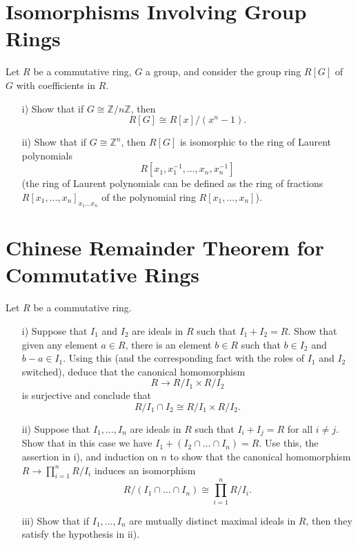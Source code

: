 \documentclass[lang=cn,11pt]{template}
\begin{document}
\section{Isomorphisms Involving Group Rings}
Let \( R \) be a commutative ring, \( G \) a group, and consider the group ring \( R[G] \) of \( G \) with coefficients in \( R \).
\begin{itemize}
    \item[i)] Show that if \( G \cong \mathbb{Z}/n\mathbb{Z} \), then
    \[
    R[G] \cong R[x]/(x^n - 1).
    \]
    \item[ii)] Show that if \( G \cong \mathbb{Z}^n \), then \( R[G] \) is isomorphic to the ring of Laurent polynomials
    \[
    R[x_1, x_1^{-1}, \dots, x_n, x_n^{-1}]
    \]
    (the ring of Laurent polynomials can be defined as the ring of fractions \( R[x_1, \dots, x_n]_{x_1 \dots x_n} \) of the polynomial ring \( R[x_1, \dots, x_n] \)).
\end{itemize}

\section{Chinese Remainder Theorem for Commutative Rings}
Let \( R \) be a commutative ring.
\begin{itemize}
    \item[i)] Suppose that \( I_1 \) and \( I_2 \) are ideals in \( R \) such that \( I_1 + I_2 = R \). Show that given any element \( a \in R \), there is an element \( b \in R \) such that \( b \in I_2 \) and \( b - a \in I_1 \). Using this (and the corresponding fact with the roles of \( I_1 \) and \( I_2 \) switched), deduce that the canonical homomorphism
    \[
    R \rightarrow R/I_1 \times R/I_2
    \]
    is surjective and conclude that
    \[
    R/I_1 \cap I_2 \cong R/I_1 \times R/I_2.
    \]
    \item[ii)] Suppose that \( I_1, \dots, I_n \) are ideals in \( R \) such that \( I_i + I_j = R \) for all \( i \neq j \). Show that in this case we have \( I_1 + (I_2 \cap \dots \cap I_n) = R \). Use this, the assertion in i), and induction on \( n \) to show that the canonical homomorphism \( R \rightarrow \prod_{i=1}^n R/I_i \) induces an isomorphism
    \[
    R/(I_1 \cap \dots \cap I_n) \cong \prod_{i=1}^n R/I_i.
    \]
    \item[iii)] Show that if \( I_1, \dots, I_n \) are mutually distinct maximal ideals in \( R \), then they satisfy the hypothesis in ii).
\end{itemize}
\end{document}
